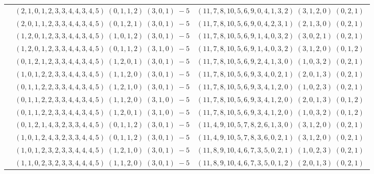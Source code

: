 \documentclass[11pt]{article}
\begin{document}
\begin{longtable}[l]{|c|c|c|}
 \cline{2-3} 
 & $(2 ,1 ,0 ,1 ,2 ,3 ,3 ,4 ,4 ,3 ,4 ,5) \;(0 ,1 ,1 ,2) \;(3 ,0 ,1) \;-5$ & $(11 ,7 ,8 ,10 ,5 ,6 ,9 ,0 ,4 ,1 ,3 ,2) \;(3 ,1 ,2 ,0) \;(0 ,2 ,1) \;$\\ 
 \cline{2-3} 
 & $(2 ,0 ,1 ,1 ,2 ,3 ,3 ,4 ,4 ,3 ,4 ,5) \;(0 ,1 ,2 ,1) \;(3 ,0 ,1) \;-5$ & $(11 ,7 ,8 ,10 ,5 ,6 ,9 ,0 ,4 ,2 ,3 ,1) \;(2 ,1 ,3 ,0) \;(0 ,2 ,1) \;$\\ 
 \cline{2-3} 
 & $(1 ,2 ,0 ,1 ,2 ,3 ,3 ,4 ,4 ,3 ,4 ,5) \;(1 ,0 ,1 ,2) \;(3 ,0 ,1) \;-5$ & $(11 ,7 ,8 ,10 ,5 ,6 ,9 ,1 ,4 ,0 ,3 ,2) \;(3 ,0 ,2 ,1) \;(0 ,2 ,1) \;$\\ 
 \cline{2-3} 
 & $(1 ,2 ,0 ,1 ,2 ,3 ,3 ,4 ,4 ,3 ,4 ,5) \;(0 ,1 ,1 ,2) \;(3 ,1 ,0) \;-5$ & $(11 ,7 ,8 ,10 ,5 ,6 ,9 ,1 ,4 ,0 ,3 ,2) \;(3 ,1 ,2 ,0) \;(0 ,1 ,2) \;$\\ 
 \cline{2-3} 
 & $(0 ,1 ,2 ,1 ,2 ,3 ,3 ,4 ,4 ,3 ,4 ,5) \;(1 ,2 ,0 ,1) \;(3 ,0 ,1) \;-5$ & $(11 ,7 ,8 ,10 ,5 ,6 ,9 ,2 ,4 ,1 ,3 ,0) \;(1 ,0 ,3 ,2) \;(0 ,2 ,1) \;$\\ 
 \cline{2-3} 
 & $(1 ,0 ,1 ,2 ,2 ,3 ,3 ,4 ,4 ,3 ,4 ,5) \;(1 ,1 ,2 ,0) \;(3 ,0 ,1) \;-5$ & $(11 ,7 ,8 ,10 ,5 ,6 ,9 ,3 ,4 ,0 ,2 ,1) \;(2 ,0 ,1 ,3) \;(0 ,2 ,1) \;$\\ 
 \cline{2-3} 
 & $(0 ,1 ,1 ,2 ,2 ,3 ,3 ,4 ,4 ,3 ,4 ,5) \;(1 ,2 ,1 ,0) \;(3 ,0 ,1) \;-5$ & $(11 ,7 ,8 ,10 ,5 ,6 ,9 ,3 ,4 ,1 ,2 ,0) \;(1 ,0 ,2 ,3) \;(0 ,2 ,1) \;$\\ 
 \cline{2-3} 
 & $(0 ,1 ,1 ,2 ,2 ,3 ,3 ,4 ,4 ,3 ,4 ,5) \;(1 ,1 ,2 ,0) \;(3 ,1 ,0) \;-5$ & $(11 ,7 ,8 ,10 ,5 ,6 ,9 ,3 ,4 ,1 ,2 ,0) \;(2 ,0 ,1 ,3) \;(0 ,1 ,2) \;$\\ 
 \cline{2-3} 
 & $(0 ,1 ,1 ,2 ,2 ,3 ,3 ,4 ,4 ,3 ,4 ,5) \;(1 ,2 ,0 ,1) \;(3 ,1 ,0) \;-5$ & $(11 ,7 ,8 ,10 ,5 ,6 ,9 ,3 ,4 ,1 ,2 ,0) \;(1 ,0 ,3 ,2) \;(0 ,1 ,2) \;$\\ 
 \cline{2-3} 
 & $(0 ,1 ,2 ,1 ,4 ,3 ,2 ,3 ,3 ,4 ,4 ,5) \;(0 ,1 ,1 ,2) \;(3 ,0 ,1) \;-5$ & $(11 ,4 ,9 ,10 ,5 ,7 ,8 ,2 ,6 ,1 ,3 ,0) \;(3 ,1 ,2 ,0) \;(0 ,2 ,1) \;$\\ 
 \cline{2-3} 
 & $(1 ,0 ,1 ,2 ,4 ,3 ,2 ,3 ,3 ,4 ,4 ,5) \;(0 ,1 ,1 ,2) \;(3 ,0 ,1) \;-5$ & $(11 ,4 ,9 ,10 ,5 ,7 ,8 ,3 ,6 ,0 ,2 ,1) \;(3 ,1 ,2 ,0) \;(0 ,2 ,1) \;$\\ 
 \cline{2-3} 
 & $(1 ,0 ,1 ,2 ,3 ,2 ,3 ,3 ,4 ,4 ,4 ,5) \;(1 ,2 ,1 ,0) \;(3 ,0 ,1) \;-5$ & $(11 ,8 ,9 ,10 ,4 ,6 ,7 ,3 ,5 ,0 ,2 ,1) \;(1 ,0 ,2 ,3) \;(0 ,2 ,1) \;$\\ 
 \cline{2-3} 
 & $(1 ,1 ,0 ,2 ,3 ,2 ,3 ,3 ,4 ,4 ,4 ,5) \;(1 ,1 ,2 ,0) \;(3 ,0 ,1) \;-5$ & $(11 ,8 ,9 ,10 ,4 ,6 ,7 ,3 ,5 ,0 ,1 ,2) \;(2 ,0 ,1 ,3) \;(0 ,2 ,1) \;$\\ 

\end{longtable}
\end{document}
